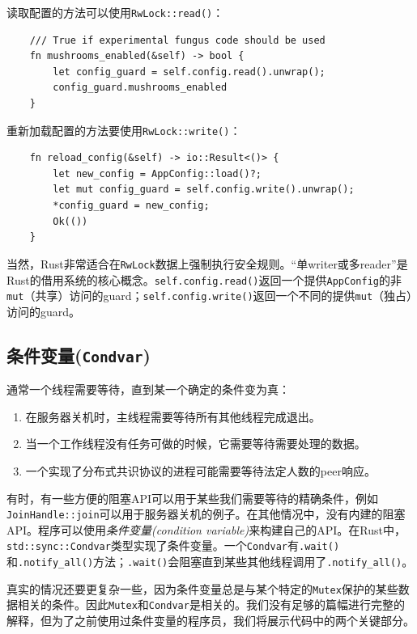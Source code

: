 读取配置的方法可以使用\texttt{RwLock::read()}：
\begin{verbatim}
    /// True if experimental fungus code should be used 
    fn mushrooms_enabled(&self) -> bool {
        let config_guard = self.config.read().unwrap();
        config_guard.mushrooms_enabled
    }
\end{verbatim}

重新加载配置的方法要使用\texttt{RwLock::write()}：
\begin{verbatim}
    fn reload_config(&self) -> io::Result<()> {
        let new_config = AppConfig::load()?;
        let mut config_guard = self.config.write().unwrap();
        *config_guard = new_config;
        Ok(())
    }
\end{verbatim}

当然，Rust非常适合在\texttt{RwLock}数据上强制执行安全规则。“单writer或多reader”是Rust的借用系统的核心概念。\texttt{self.config.read()}返回一个提供\texttt{AppConfig}的非\texttt{mut}（共享）访问的guard；\texttt{self.config.write()}返回一个不同的提供\texttt{mut}（独占）访问的guard。

\subsection{条件变量(\texttt{Condvar})}
通常一个线程需要等待，直到某一个确定的条件变为真：
\begin{enumerate}
    \item 在服务器关机时，主线程需要等待所有其他线程完成退出。
    \item 当一个工作线程没有任务可做的时候，它需要等待需要处理的数据。
    \item 一个实现了分布式共识协议的进程可能需要等待法定人数的peer响应。
\end{enumerate}

有时，有一些方便的阻塞API可以用于某些我们需要等待的精确条件，例如\texttt{JoinHandle::join}可以用于服务器关机的例子。在其他情况中，没有内建的阻塞API。程序可以使用\emph{条件变量(condition variable)}来构建自己的API。在Rust中，\texttt{std::sync::Condvar}类型实现了条件变量。一个\texttt{Condvar}有\texttt{.wait()}和\texttt{.notify\_all()}方法；\texttt{.wait()}会阻塞直到某些其他线程调用了\texttt{.notify\_all()}。

真实的情况还要更复杂一些，因为条件变量总是与某个特定的\texttt{Mutex}保护的某些数据相关的条件。因此\texttt{Mutex}和\texttt{Condvar}是相关的。我们没有足够的篇幅进行完整的解释，但为了之前使用过条件变量的程序员，我们将展示代码中的两个关键部分。

